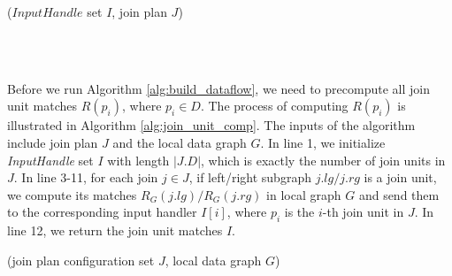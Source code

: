 \begin{algorithm}[htb]
\SetAlgoVlined
{}
\small
\caption{($InputHandle$ set $I$, join plan $J$)}
\label{alg:build_dataflow}
 {
}
\\
\\
\end{algorithm}


 Before we run Algorithm \ref{alg:build_dataflow}, we need to precompute all join unit matches $R(p_i)$, where $p_i \in D$. The process of computing $R(p_i)$ is illustrated in Algorithm \ref{alg:join_unit_comp}. The inputs of the algorithm include join plan $J$ and the local data graph $G$. In line 1, we initialize \textit{InputHandle} set $I$ with length $|J.D|$, which is exactly the number of join units in $J$. In line 3-11, for each join $j\in J$, if left/right subgraph $j.lg/j.rg$ is a join unit, we compute its matches $R_G(j.lg)/R_G(j.rg)$ in local graph $G$ and send them to the corresponding input handler $I[i]$, where $p_i$ is the $i$-th join unit in $J$. In line 12, we return the join unit matches $I$. 


\begin{algorithm}[htb]
\SetAlgoVlined
{}
\small
\caption{(join plan configuration set $J$, local data graph $G$)}
\label{alg:join_unit_comp}
\\
\\
\end{algorithm}


